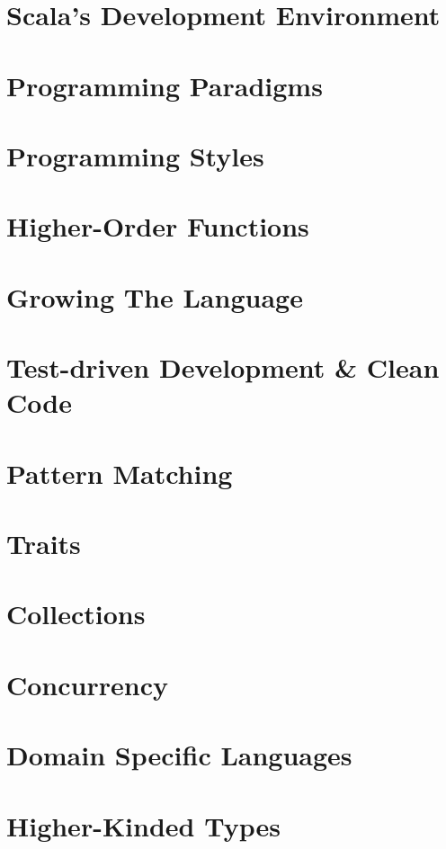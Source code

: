 \part[Scala's Development Environment]{Scala's Development Environment}
\part[Programming Paradigms]{Programming Paradigms}
\part[Programming Styles]{Programming Styles}
\part[Higher-Order Functions]{Higher-Order Functions}
\part[Growing The Language]{Growing The Language}
\part[TDD \& Clean Code]{Test-driven Development \& Clean Code}
\part[Pattern Matching]{Pattern Matching}
\part[Traits]{Traits}
\part[Collections]{Collections}
\part[Concurrency]{Concurrency}
\part[DSLs]{Domain Specific Languages}
\part[Higher-Kinded Types]{Higher-Kinded Types}